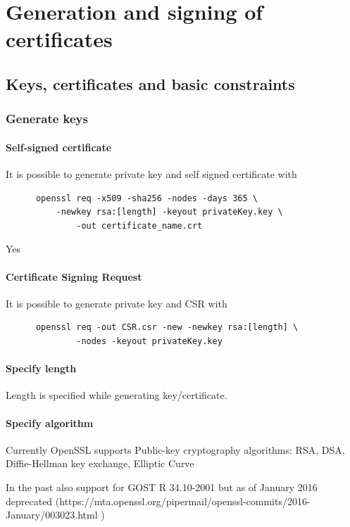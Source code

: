 \documentclass[10pt, a4paper]{report}
\begin{document}
\section{Generation and signing of certificates}

  \subsection{Keys, certificates and basic constraints}
  
    \subsubsection{Generate keys}
    
      \paragraph{Self-signed certificate}
      It is possible to generate private key and self signed certificate with 
      \begin{verbatim}
      openssl req -x509 -sha256 -nodes -days 365 \
	      -newkey rsa:[length] -keyout privateKey.key \
              -out certificate_name.crt
      \end{verbatim}
      Yes             
      \paragraph{Certificate Signing Request}
      It is possible to generate private key and CSR with
      \begin{verbatim}
      openssl req -out CSR.csr -new -newkey rsa:[length] \
              -nodes -keyout privateKey.key
      \end{verbatim}
      
      \paragraph{Specify length}
      Length is specified while generating key/certificate.
      
      \paragraph{Specify algorithm}
      Currently OpenSSL supports Public-key cryptography algorithms:
      RSA, DSA, Diffie-Hellman key exchange, Elliptic Curve
      
      In the past also support for GOST R 34.10-2001 but as of January 2016 deprecated (https://mta.openssl.org/pipermail/openssl-commits/2016-January/003023.html )
      
\end{document}
